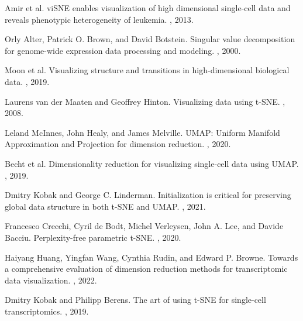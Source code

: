 \documentclass{article}
\begin{document}



\begin{thebibliography}{10}

Amir et al.
\newblock viSNE enables visualization of high dimensional single-cell data and reveals phenotypic heterogeneity of leukemia.
, 2013.

Orly Alter, Patrick O. Brown, and David Botstein.
\newblock Singular value decomposition for genome-wide expression data processing and modeling.
, 2000.

Moon et al.
\newblock Visualizing structure and transitions in high-dimensional biological data.
, 2019.

Laurens van der Maaten and Geoffrey Hinton.
\newblock Visualizing data using t-SNE.
, 2008.

Leland McInnes, John Healy, and James Melville.
\newblock UMAP: Uniform Manifold Approximation and Projection for dimension reduction.
, 2020.

Becht et al.
\newblock Dimensionality reduction for visualizing single-cell data using UMAP.
, 2019.

Dmitry Kobak and George C. Linderman.
\newblock Initialization is critical for preserving global data structure in both t-SNE and UMAP.
, 2021.

Francesco Crecchi, Cyril de Bodt, Michel Verleysen, John A. Lee, and Davide Bacciu.
\newblock Perplexity-free parametric t-SNE.
, 2020.

Haiyang Huang, Yingfan Wang, Cynthia Rudin, and Edward P. Browne.
\newblock Towards a comprehensive evaluation of dimension reduction methods for transcriptomic data visualization.
, 2022.

Dmitry Kobak and Philipp Berens.
\newblock The art of using t-SNE for single-cell transcriptomics.
, 2019.


\end{thebibliography}
\end{document}
